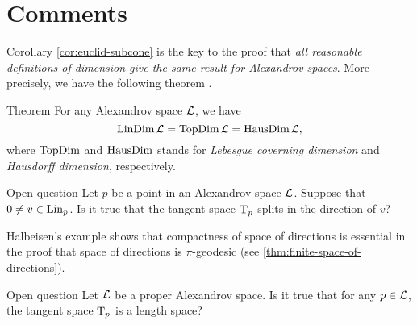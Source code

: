 \section{Comments}

Corollary \ref{cor:euclid-subcone} is the key to the proof that \textit{all reasonable definitions of dimension give the same result for Alexandrov spaces}.
More precisely, we have the following theorem \cite[15.16]{alexander-kapovitch-petrunin2024}.

\begin{thm}{Theorem}\label{thm:dim=dim}
For any Alexandrov space $\mathcal{L}$, we have
\[\mathop{\rm LinDim}\nolimits \mathcal{L}=\mathop{\rm TopDim}\nolimits \mathcal{L}=\mathop{\rm HausDim}\nolimits \mathcal{L},\]
where $\mathop{\rm TopDim}\nolimits$ and $\mathop{\rm HausDim}\nolimits$ stands for \emph{Lebesgue coverning dimension} and \emph{Hausdorff dimension}, respectively.
\end{thm}


\begin{thm}{Open question}
Let $p$ be a point in an Alexandrov space $\mathcal{L}$.
Suppose that $0\ne v\in \mathop{\rm Lin}\nolimits_p$.
Is it true that the tangent space $\mathrm{T}_p$ splits in the direction of $v$?
\end{thm}

Halbeisen's example \cite{alexander-kapovitch-petrunin2024,halbeisen} shows that compactness of space of directions is essential in the proof that space of directions is $\pi$-geodesic (see \ref{thm:finite-space-of-directions}).

\begin{thm}{Open question}\label{open:Halb-proper}
Let $\mathcal{L}$ be a proper Alexandrov space.
Is it true that for any $p\in \mathcal{L}$, the tangent space $\mathrm{T}_p$ is a length space?
\end{thm}
